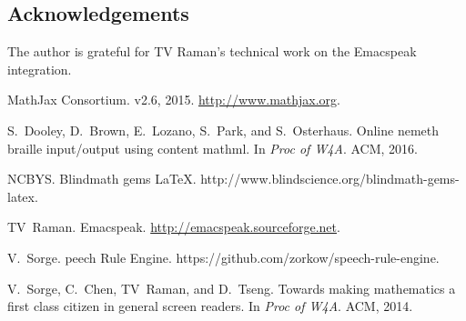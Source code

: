 \documentclass{sig-alternate-05-2015}
\begin{document}
\subsection*{Acknowledgements}

The author is grateful for TV Raman's technical work on the Emacspeak
integration.

\begin{thebibliography}{1}

MathJax Consortium.
 v2.6, 2015.
\newblock \url{http://www.mathjax.org}.

S.~Dooley, D.~Brown, E.~Lozano, S.~Park, and S.~Osterhaus.
\newblock Online nemeth braille input/output using content mathml.
\newblock In {\em Proc of W4A}. ACM, 2016.

NCBYS.
\newblock Blindmath gems {LaTeX}.
\newblock http://www.blindscience.org/blindmath-gems-latex.

TV~Raman.
\newblock Emacspeak.
\newblock \url{http://emacspeak.sourceforge.net}.

V.~Sorge.
peech {R}ule {E}ngine.
\newblock https://github.com/zorkow/speech-rule-engine.

V.~Sorge, C.~Chen, TV~Raman, and D.~Tseng.
\newblock Towards making mathematics a first class citizen in general screen
  readers.
\newblock In {\em Proc of W4A}. ACM, 2014.

\end{thebibliography}
\end{document}
